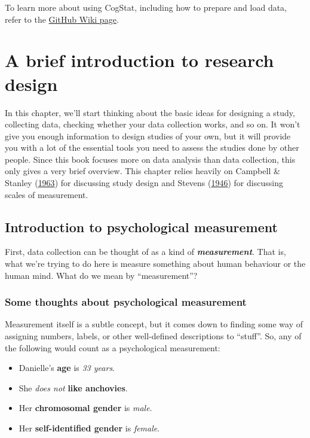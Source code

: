 \documentclass[
]{book}
\providecommand{\tightlist}{%
  \setlength{\itemsep}{0pt}\setlength{\parskip}{0pt}}
\theoremstyle{definition}
\theoremstyle{definition}
\theoremstyle{definition}
\theoremstyle{definition}
\theoremstyle{remark}
\begin{document}
To learn more about using CogStat, including how to prepare and load data, refer to the \href{https://github.com/cogstat/cogstat/wiki/Documentation-for-users}{GitHub Wiki page}.

\hypertarget{researchdesign}{%
\chapter{A brief introduction to research design}\label{researchdesign}}

In this chapter, we'll start thinking about the basic ideas for designing a study, collecting data, checking whether your data collection works, and so on. It won't give you enough information to design studies of your own, but it will provide you with a lot of the essential tools you need to assess the studies done by other people. Since this book focuses more on data analysis than data collection, this only gives a very brief overview. This chapter relies heavily on Campbell \& Stanley (\protect\hyperlink{ref-Campbell1963}{1963}) for discussing study design and Stevens (\protect\hyperlink{ref-Stevens1946}{1946}) for discussing scales of measurement.

\hypertarget{measurement}{%
\section{Introduction to psychological measurement}\label{measurement}}

First, data collection can be thought of as a kind of \textbf{\emph{measurement}}. That is, what we're trying to do here is measure something about human behaviour or the human mind. What do we mean by ``measurement''?

\hypertarget{some-thoughts-about-psychological-measurement}{%
\subsection{Some thoughts about psychological measurement}\label{some-thoughts-about-psychological-measurement}}

Measurement itself is a subtle concept, but it comes down to finding some way of assigning numbers, labels, or other well-defined descriptions to ``stuff''. So, any of the following would count as a psychological measurement:

\begin{itemize}
\tightlist
\item
  Danielle's \textbf{age} is \emph{33 years}.
\item
  She \emph{does not} \textbf{like anchovies}.
\item
  Her \textbf{chromosomal gender} is \emph{male}.
\item
  Her \textbf{self-identified gender} is \emph{female}.
\end{itemize}
\end{document}
